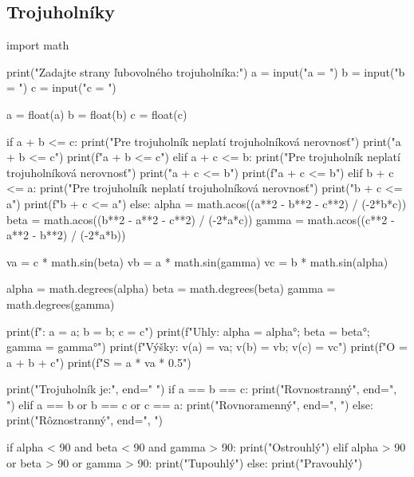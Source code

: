 \subsection{Trojuholníky}
\begin{solution}
import math

print("Zadajte strany ľubovolného trojuholníka:")
a = input("a = ")
b = input("b = ")
c = input("c = ")

a = float(a)
b = float(b)
c = float(c)

if a + b <= c:
	print("Pre trojuholník neplatí trojuholníková nerovnosť")
	print("a + b <= c")
	print(f"{a} + {b} <= {c}")
elif a + c <= b:
	print("Pre trojuholník neplatí trojuholníková nerovnosť")
	print("a + c <= b")
	print(f"{a} + {c} <= {b}")
elif b + c <= a:
	print("Pre trojuholník neplatí trojuholníková nerovnosť")
	print("b + c <= a")
	print(f"{b} + {c} <= {a}")
else:
	alpha = math.acos((a**2 - b**2 - c**2) / (-2*b*c))
	beta = math.acos((b**2 - a**2 - c**2) / (-2*a*c))
	gamma = math.acos((c**2 - a**2 - b**2) / (-2*a*b))

	va = c * math.sin(beta)
	vb = a * math.sin(gamma)
	vc = b * math.sin(alpha)

	alpha = math.degrees(alpha)
	beta = math.degrees(beta)
	gamma = math.degrees(gamma)

    print(f"\nStrany: a = {a}; b = {b}; c = {c}")
    print(f"Uhly: alpha = {alpha}°; beta = {beta}°; gamma = {gamma}°")
    print(f"Výšky: v(a) = {va}; v(b) = {vb}; v(c) = {vc}")
    print(f"O = {a + b + c}")
    print(f"S = {a * va * 0.5}")

        print("Trojuholník je:", end=" ")
        if a == b == c:
            print("Rovnostranný", end=", ")
        elif a == b or b == c or c == a:
            print("Rovnoramenný", end=", ")
        else:
            print("Rôznostranný", end=", ")

	if alpha < 90 and beta < 90 and gamma > 90:
		print("Ostrouhlý")
	elif alpha > 90 or beta > 90 or gamma > 90:
		print("Tupouhlý")
	else:
        print("Pravouhlý")
\end{solution}
